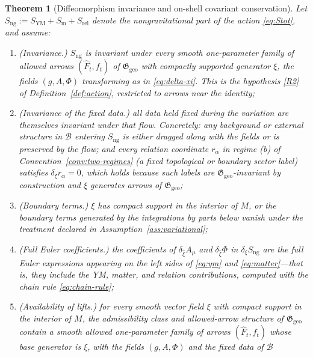 \documentclass[11pt,a4paper]{article}
\theoremstyle{plain}
\newtheorem{theorem}{Theorem}[section]
\theoremstyle{definition}
\theoremstyle{remark}
\newcommand{\Ggeo}{\mathfrak{G}_{\mathrm{geo}}}
\begin{document}
\begin{theorem}[Diffeomorphism invariance and on-shell covariant conservation]
\label{thm:cons}
Let
$S_{\mathrm{ng}}:=S_{\mathrm{YM}}+S_{\mathrm{m}}+S_{\mathrm{rel}}$
denote the nongravitational part of the action \eqref{eq:Stot}, and assume:
\begin{enumerate}[label=(C\arabic*),leftmargin=2.8em]
\item\label{C1} \emph{(Invariance.)} $S_{\mathrm{ng}}$ is invariant under every smooth
      one-parameter family of allowed arrows $(\hat F_t,f_t)$ of $\Ggeo$ with compactly supported
      generator $\xi$, the fields $(g,A,\Phi)$ transforming as in \eqref{eq:delta-xi}. This is the
      hypothesis \ref{R2} of Definition~\ref{def:action}, restricted to arrows near the identity;
\item\label{C2} \emph{(Invariance of the fixed data.)} all data held fixed during the variation are
      themselves invariant under that flow. Concretely: any background or external structure in
      $\mathcal{B}$ entering $S_{\mathrm{ng}}$ is either dragged along with the fields or is
      preserved by the flow; and every relation coordinate $r_\alpha$ in regime (b) of
      Convention~\ref{conv:two-regimes} (a fixed topological or boundary sector label) satisfies
      $\delta_\xi r_\alpha=0$, which holds because such labels are $\Ggeo$-invariant by
      construction and $\xi$ generates arrows of $\Ggeo$;
\item\label{C3} \emph{(Boundary terms.)} $\xi$ has compact support in the interior of $M$, or the
      boundary terms generated by the integrations by parts below vanish under the treatment
      declared in Assumption~\ref{ass:variational};
\item\label{C4} \emph{(Full Euler coefficients.)} the coefficients of $\delta_{\hat\xi} A_\mu$ and
      $\delta_{\hat\xi}\Phi$ in $\delta_\xi S_{\mathrm{ng}}$ are the \emph{full} Euler expressions
      appearing on the left sides of \eqref{eq:ym} and \eqref{eq:matter}---that is, they include the
      YM, matter, \emph{and} relation contributions, computed with the chain rule
      \eqref{eq:chain-rule};
\item\label{C5} \emph{(Availability of lifts.)} for \emph{every} smooth vector field $\xi$ with
      compact support in the interior of $M$, the admissibility class and allowed-arrow structure of
      $\Ggeo$ contain a smooth allowed one-parameter family of arrows $(\hat F_t,f_t)$ whose base
      generator is $\xi$, with the fields $(g,A,\Phi)$ and the fixed data of $\mathcal{B}$

\end{enumerate}
\end{theorem}
\end{document}
